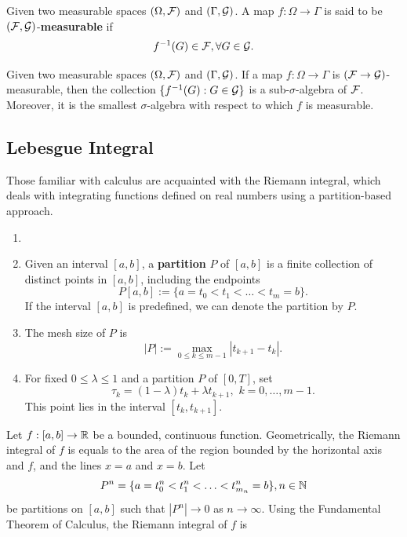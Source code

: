 \begin{definition}
  Given two measurable spaces $(\Omega, \mathcal{F})$ and $(\Gamma,\mathcal{G})$. A map $f:\Omega\to\Gamma$ is said to be $(\mathcal{F},\mathcal{G})$-\textbf{measurable}  if
  $$f^{-1}(G)\in\mathcal{F},\forall G\in \mathcal{G}.$$
\end{definition}

\begin{proposition}
  \label{preposition:preimage-of-a-measurable-map-over-the imaged-sigma-algebra-is-a-sigma-algebra}
  Given two measurable spaces $(\Omega, \mathcal{F})$ and $(\Gamma,\mathcal{G})$. If a map $f:\Omega\to\Gamma$ is $(\mathcal{F}\to\mathcal{G})$-measurable, then the collection $\{f^{-1}(G) : G\in\mathcal{G}\}$ is a sub-$\sigma$-algebra of $\mathcal{F}$. Moreover, it is the smallest $\sigma$-algebra with respect to which $f$ is measurable.
\end{proposition}

\subsection{Lebesgue Integral}

Those familiar with calculus are acquainted with the Riemann integral, which deals with integrating functions defined on real numbers using a partition-based approach.

\begin{definition}
  \begin{enumerate}
    \item []
    \item Given an interval $[a,b]$, a \textbf{partition} $P$ of $[a,b]$ is a finite collection of distinct points in $[a, b]$, including the endpoints
          $$P[a,b]:=\{a=t_0<t_1<\ldots<t_{m}=b\}.$$
          If the interval $[a,b]$ is predefined, we can denote the partition by $P$.
    \item The mesh size of $P$ is
          $$|P|:=\max\limits_{0\le k\le m-1}|t_{k+1}-t_k|.$$
    \item For fixed $0\le\lambda\le 1$ and a partition $P$ of $[0,T]$, set
          $$\tau_k = (1-\lambda) t_k + \lambda t_{k+1},\,\, k=0,\ldots,m-1.$$
          This point lies in the interval $[t_k,t_{k+1}]$.
  \end{enumerate}
\end{definition}

Let $f: [a,b]\to\mathbb{R}$ be a bounded, continuous function. Geometrically, the Riemann integral of $f$ is equals to the area of the region bounded by the horizontal axis and $f$, and the lines $x=a$ and $x=b$. Let
$$P^n=\{a=t^n_0<t^n_1<\ldots<t^n_{m_n}=b\}, n\in\mathbb{N}$$ be partitions on $[a,b]$ such that $|P^n|\to 0$ as $n\to\infty$. Using the Fundamental Theorem of Calculus, the Riemann integral of $f$ is

